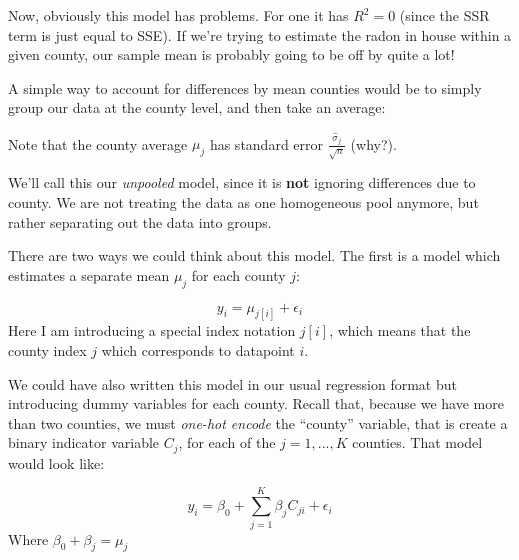 \documentclass[
]{article}
\newenvironment{Shaded}{\begin{snugshade}}{\end{snugshade}}
\newcommand{\AttributeTok}[1]{\textcolor[rgb]{0.77,0.63,0.00}{#1}}
\newcommand{\FunctionTok}[1]{\textcolor[rgb]{0.00,0.00,0.00}{#1}}
\newcommand{\NormalTok}[1]{#1}
\newcommand{\OtherTok}[1]{\textcolor[rgb]{0.56,0.35,0.01}{#1}}
\newcommand{\SpecialCharTok}[1]{\textcolor[rgb]{0.00,0.00,0.00}{#1}}
\begin{document}
Now, obviously this model has problems. For one it has \(R^2=0\) (since
the SSR term is just equal to SSE). If we're trying to estimate the
radon in house within a given county, our sample mean is probably going
to be off by quite a lot!

A simple way to account for differences by mean counties would be to
simply group our data at the county level, and then take an average:

\begin{Shaded}
\end{Shaded}

Note that the county average \(\mu_j\) has standard error
\(\frac{\hat \sigma_j}{\sqrt{n}}\) (why?).

We'll call this our \emph{unpooled} model, since it is \textbf{not}
ignoring differences due to county. We are not treating the data as one
homogeneous pool anymore, but rather separating out the data into
groups.

There are two ways we could think about this model. The first is a model
which estimates a separate mean \(\mu_j\) for each county \(j\):

\[
y_i = \mu_{j[i]} + \epsilon_i 
\] Here I am introducing a special index notation \(j[i]\), which means
that the county index \(j\) which corresponds to datapoint \(i\).

We could have also written this model in our usual regression format but
introducing dummy variables for each county. Recall that, because we
have more than two counties, we must \emph{one-hot encode} the
``county'' variable, that is create a binary indicator variable \(C_j\),
for each of the \(j=1,...,K\) counties. That model would look like:

\[
y_i = \beta_0 + \sum_{j=1}^K \beta_j C_{ji} + \epsilon_i 
\] Where \(\beta_0 + \beta_j = \mu_j\)
\end{document}
